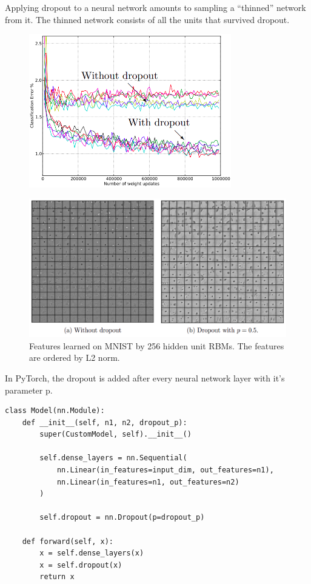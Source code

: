 \documentclass{report}
\begin{document}
Applying dropout to a neural network amounts to sampling a “thinned” network from it. The thinned network consists of all the units that survived dropout.

\begin{figure}[ht]
	\includegraphics[width=250pt]{17}
	\centering
\end{figure}

\begin{figure}[ht]
	\includegraphics[width=450pt]{18}
	\centering 
	\caption{Features learned on MNIST by 256 hidden unit RBMs. The features are ordered by L2 norm.}
\end{figure}

In PyTorch, the dropout is added after every neural network layer with it's parameter p.

\begin{verbatim}
class Model(nn.Module):
    def __init__(self, n1, n2, dropout_p):
        super(CustomModel, self).__init__()
        
        self.dense_layers = nn.Sequential(
            nn.Linear(in_features=input_dim, out_features=n1),
            nn.Linear(in_features=n1, out_features=n2)
        )
        
        self.dropout = nn.Dropout(p=dropout_p)

    def forward(self, x):
        x = self.dense_layers(x)
        x = self.dropout(x)
        return x
\end{verbatim}
\end{document}
